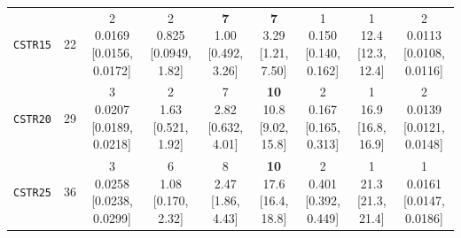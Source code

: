 \begin{tabular}{@{}lrccccccc@{}}
\texttt{CSTR15} & 22 & \makecell{2\\0.0169\\{[0.0156, 0.0172]}} & \makecell{2\\0.825\\{[0.0949, 1.82]}} & \makecell{\textbf{7}\\1.00\\{[0.492, 3.26]}} & \makecell{\textbf{7}\\3.29\\{[1.21, 7.50]}} & \makecell{1\\0.150\\{[0.140, 0.162]}} & \makecell{1\\12.4\\{[12.3, 12.4]}} & \makecell{2\\0.0113\\{[0.0108, 0.0116]}} \\
\texttt{CSTR20} & 29 & \makecell{3\\0.0207\\{[0.0189, 0.0218]}} & \makecell{2\\1.63\\{[0.521, 1.92]}} & \makecell{7\\2.82\\{[0.632, 4.01]}} & \makecell{\textbf{10}\\10.8\\{[9.02, 15.8]}} & \makecell{2\\0.167\\{[0.165, 0.313]}} & \makecell{1\\16.9\\{[16.8, 16.9]}} & \makecell{2\\0.0139\\{[0.0121, 0.0148]}} \\
\texttt{CSTR25} & 36 & \makecell{3\\0.0258\\{[0.0238, 0.0299]}} & \makecell{6\\1.08\\{[0.170, 2.32]}} & \makecell{8\\2.47\\{[1.86, 4.43]}} & \makecell{\textbf{10}\\17.6\\{[16.4, 18.8]}} & \makecell{2\\0.401\\{[0.392, 0.449]}} & \makecell{1\\21.3\\{[21.3, 21.4]}} & \makecell{1\\0.0161\\{[0.0147, 0.0186]}} \\

\end{tabular}
